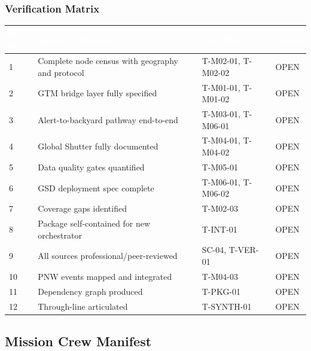 \documentclass[11pt,letterpaper]{article}
\newcommand{\tableheader}[1]{\textbf{\sffamily\textcolor{white}{#1}}}
\begin{document}
\subsubsection{Verification Matrix}

\begin{center}
\begin{tabularx}{\textwidth}{C{1cm}L{5cm}L{3cm}C{1.5cm}}
\toprule
{}
\tableheader{SC \#} & \tableheader{Success Criterion} & \tableheader{Test IDs} & \tableheader{Status} \\
 & Complete node census with geography and protocol & T-M02-01, T-M02-02 & OPEN \\
2 & GTM bridge layer fully specified & T-M01-01, T-M01-02 & OPEN \\
3 & Alert-to-backyard pathway end-to-end & T-M03-01, T-M06-01 & OPEN \\
4 & Global Shutter fully documented & T-M04-01, T-M04-02 & OPEN \\
5 & Data quality gates quantified & T-M05-01 & OPEN \\
6 & GSD deployment spec complete & T-M06-01, T-M06-02 & OPEN \\
7 & Coverage gaps identified & T-M02-03 & OPEN \\
8 & Package self-contained for new orchestrator & T-INT-01 & OPEN \\
9 & All sources professional/peer-reviewed & SC-04, T-VER-01 & OPEN \\
10 & PNW events mapped and integrated & T-M04-03 & OPEN \\
11 & Dependency graph produced & T-PKG-01 & OPEN \\
12 & Through-line articulated & T-SYNTH-01 & OPEN \\
\bottomrule
\end{tabularx}
\end{center}

\subsection{Mission Crew Manifest}
\end{document}
